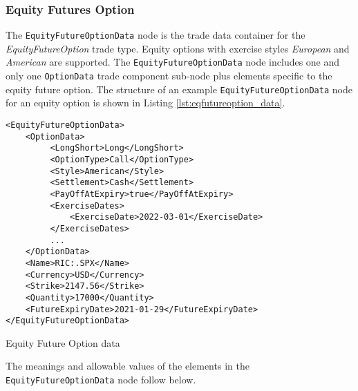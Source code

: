 \subsubsection{Equity Futures Option}

The \lstinline!EquityFutureOptionData!  node is the trade data container for the \emph{EquityFutureOption} trade type.  Equity 
options with exercise styles \emph{European} and \emph{American} are supported. The \lstinline!EquityFutureOptionData!  node includes one and 
only one \lstinline!OptionData! trade component sub-node plus elements specific to the equity future option. The structure of 
an example \lstinline!EquityFutureOptionData! node for an equity option is shown in Listing
\ref{lst:eqfutureoption_data}.

\begin{listing}[H]
\begin{verbatim}
<EquityFutureOptionData>
    <OptionData>
         <LongShort>Long</LongShort>
         <OptionType>Call</OptionType>
         <Style>American</Style>
         <Settlement>Cash</Settlement>
         <PayOffAtExpiry>true</PayOffAtExpiry>
         <ExerciseDates>
             <ExerciseDate>2022-03-01</ExerciseDate>
         </ExerciseDates>
         ...
    </OptionData>
    <Name>RIC:.SPX</Name>
    <Currency>USD</Currency>
    <Strike>2147.56</Strike>
    <Quantity>17000</Quantity>
    <FutureExpiryDate>2021-01-29</FutureExpiryDate>
</EquityFutureOptionData>
\end{verbatim}
\caption{Equity Future Option data}
\label{lst:eqfutureoption_data}
\end{listing}

The meanings and allowable values of the elements in the \lstinline!EquityFutureOptionData!  node follow below.

